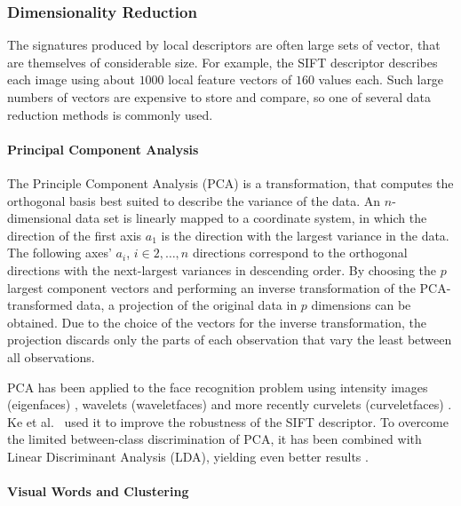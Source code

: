 \subsubsection{Dimensionality Reduction}

The signatures produced by local descriptors are often large sets of vector,
that are themselves of considerable size. For example, the SIFT descriptor
describes each image using about $1000$ local feature vectors of $160$ values
each. Such large numbers of vectors are expensive to store and compare, so one
of several data reduction methods is commonly used.

\paragraph{Principal Component Analysis}

The Principle Component Analysis (PCA) is a transformation, that computes the
orthogonal basis best suited to describe the variance of the data. An
$n$-dimensional data set is linearly mapped to a coordinate system, in which
the direction of the first axis $a_1$ is the direction with the largest
variance in the data. The following axes' $a_i$, $i \in 2, \dots, n$ directions
correspond to the orthogonal directions with the next-largest variances in
descending order. By choosing the $p$ largest component vectors and performing
an inverse transformation of the PCA-transformed data, a projection of the
original data in $p$ dimensions can be obtained. Due to the choice of the
vectors for the inverse transformation, the projection discards only the parts
of each observation that vary the least between all observations.

PCA has been applied to the face recognition problem using intensity images
(eigenfaces) \autocite{turk_face_1991}, wavelets (waveletfaces)
\autocite{feng_human_2000} and more recently curvelets (curveletfaces)
\autocite{mandal_face_2008}. Ke et al.\ \autocite{ke_pca-sift:_2004} used it to
improve the robustness of the SIFT \autocite{lowe_object_1999} descriptor. To
overcome the limited between-class discrimination of PCA, it has been combined
with Linear Discriminant Analysis (LDA), yielding even better results
\autocite{mandal_curvelet_2009}.

\paragraph{Visual Words and Clustering}\label{sec:anatomy_clustering}

